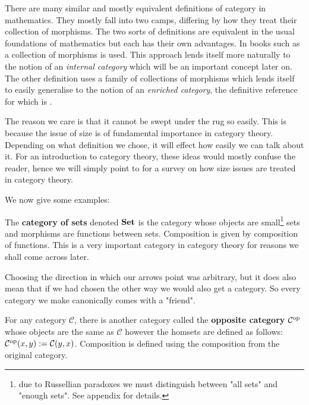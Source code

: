 \begin{remark}
    There are many similar and mostly equivalent definitions of category in mathematics. They mostly fall into two camps, differing by how they treat their collection of morphisms. The two sorts of definitions are equivalent in the usual foundations of mathematics but each has their own advantages. In books such as \cite{riehl2017category} a collection of morphisms is used. This approach lends itself more naturally to the notion of an \textit{internal category} which will be an important concept later on. The other definition uses a family of collections of morphisms which lends itself to easily generalise to the notion of an \textit{enriched category}, the definitive reference for which is \cite{kelly1982basic}.

    The reason we care is that it cannot be swept under the rug so easily. This is because the issue of size is of fundamental importance in category theory. Depending on what definition we chose, it will effect how easily we can talk about it. For an introduction to category theory, these ideas would mostly confuse the reader, hence we will simply point to \cite{2008arXiv0810.1279S} for a survey on how size issues are treated in category theory.  
\end{remark}

We now give some examples:

\begin{example}
	The \textbf{category of sets} denoted ${\normalfont\textbf{Set}}$ is the category whose objects are small\footnote{due to Russellian paradoxes we must distinguish between "all sets" and "enough sets". See appendix for details. } sets and morphisms are functions between sets. Composition is given by composition of functions. This is a very important category in category theory for reasons we shall come across later.
\end{example}

Choosing the direction in which our arrows point was arbitrary, but it does also mean that if we had chosen the other way we would also get a category. So every category we make canonically comes with a "friend".

\begin{example}
	For any category $\mathcal{C}$, there is another category called the {\bf opposite category} $\mathcal{C}^{\text{op}}$ whose objects are the same as $\mathcal{C}$ however the homsets are defined as follows: $\mathcal{C}^{\text{op}}(x,y):=\mathcal{C}(y,x)$. Composition is defined using the composition from the original category.
\end{example}

